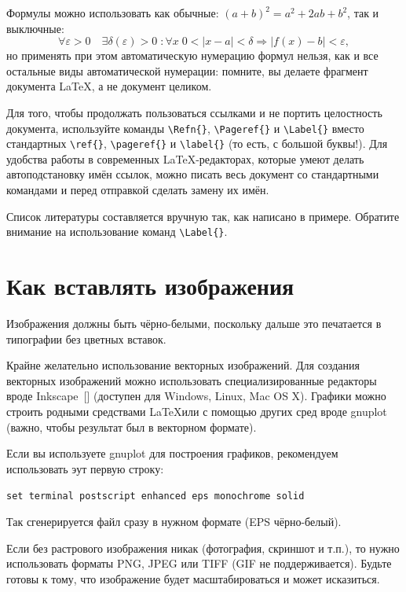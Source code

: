 Формулы можно использовать как обычные: \( (a+b)^2 = a^2 + 2ab + b^2 \), так и выключные:
\[
    \forall \varepsilon>0 \quad
    \exists \delta(\varepsilon)>0
    \; \colon \forall x \; 0<|x-a|<\delta
    \Rightarrow |f(x)-b|<\varepsilon,
\]
но применять при этом автоматическую нумерацию формул нельзя, как и все остальные виды автоматической нумерации: помните, вы делаете фрагмент документа \LaTeX{}, а не документ целиком.

Для того, чтобы продолжать пользоваться ссылками и не портить целостность документа, используйте команды \texttt{\textbackslash Refn\{\}}, \texttt{\textbackslash Pageref\{\}} и \texttt{\textbackslash Label\{\}} вместо стандартных \texttt{\textbackslash ref\{\}}, \texttt{\textbackslash pageref\{\}} и \texttt{\textbackslash label\{\}} (то есть, с большой буквы!). Для удобства работы в современных \LaTeX-редакторах, которые умеют делать автоподстановку имён ссылок, можно писать весь документ со стандартными командами и перед отправкой сделать замену их имён.

Список литературы составляется вручную так, как написано в примере. Обратите внимание на использование команд \texttt{\textbackslash Label\{\}}.

\section{Как вставлять изображения}

Изображения должны быть чёрно-белыми, поскольку дальше это печатается в типографии без цветных вставок.

Крайне желательно использование векторных изображений. Для создания векторных изображений можно использовать специализированные редакторы вроде Inkscape~[] (доступен для Windows, Linux, Mac OS X). Графики можно строить родными средствами \LaTeX или с помощью других сред вроде gnuplot (важно, чтобы результат был в векторном формате).

Если вы используете gnuplot для построения графиков, рекомендуем использовать эут первую строку:

\texttt{set terminal postscript enhanced eps monochrome solid}

Так сгенерируется файл сразу в нужном формате (EPS чёрно-белый).

Если без растрового изображения никак (фотография, скриншот и т.п.), то нужно использовать форматы PNG, JPEG или TIFF (GIF не поддерживается). Будьте готовы к тому, что изображение будет масштабироваться и может исказиться.

